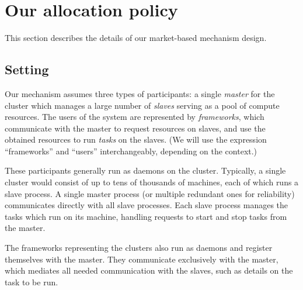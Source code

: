 \documentclass{acm_proc_article-sp}
\begin{document}

\section{Our allocation policy}

This section describes the details of our market-based mechanism design.

\label{sec:design}
\subsection{Setting}
Our mechanism assumes three types of participants: a single \emph{master} for
the cluster which manages a large number of \emph{slaves} serving as a pool of
compute resources. The users of the system are represented by \emph{frameworks},
which communicate with the master to request resources on slaves, and use the
obtained resources to run \emph{tasks} on the slaves.
(We will use the expression ``frameworks'' and ``users'' interchangeably,
depending on the context.)

These participants generally run as daemons on the cluster.  Typically, a single
cluster would consist of up to tens of thousands of machines, each of which
runs a slave process. A single master process (or multiple redundant ones
for reliability) communicates directly with all slave processes.  Each slave
process manages the tasks which run on its machine, handling requests to start
and stop tasks from the master.

The frameworks representing the clusters also run as daemons and register
themselves with the master. They communicate exclusively with the master, which
mediates all needed communication with the slaves, such as details on the task
to be run.
\end{document}
